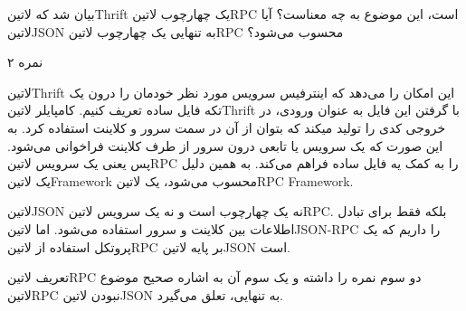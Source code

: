 \documentclass[../main.tex]{subfiles}
\begin{document}

بیان شد که ‌لاتین{Thrift} یک چهارچوب ‌لاتین{RPC} است، این موضوع به چه معناست؟ آیا ‌لاتین{JSON} به تنهایی یک چهارچوب ‌لاتین{RPC} محسوب می‌شود؟

۲ نمره

\begin{answer}

‌لاتین{Thrift} این امکان را می‌دهد که اینترفیس سرویس مورد نظر خودمان را درون یک تکه فایل ساده تعریف کنیم.
کامپایلر ‌لاتین{Thrift} با گرفتن این فایل به عنوان ورودی، در خروجی کدی را تولید میکند که بتوان از آن در سمت سرور و کلاینت استفاده کرد.
به این صورت که یک سرویس یا تابعی درون سرور از طرف کلاینت فراخوانی می‌شود. پس یعنی یک سرویس ‌لاتین{RPC} را به کمک یه فایل ساده فراهم می‌کند.
به همین دلیل یک ‌لاتین{Framework} محسوب می‌شود، یک ‌لاتین{RPC Framework}.

‌لاتین{JSON} نه یک چهارچوب است و نه یک سرویس ‌لاتین{RPC}. بلکه فقط برای تبادل اطلاعات بین کلاینت و سرور استفاده می‌شود. اما ‌لاتین{JSON-RPC} را داریم که یک پروتکل استفاده از ‌لاتین{RPC}
بر پایه ‌لاتین{JSON} است.

تعریف ‌لاتین{RPC} دو سوم نمره را داشته و یک سوم آن به اشاره صحیح موضوع ‌لاتین{RPC} نبودن ‌لاتین{JSON} به تنهایی، تعلق می‌گیرد.

\end{answer}
\end{document}
